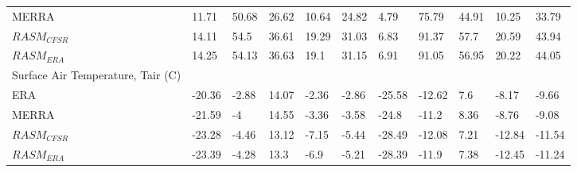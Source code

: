 \begin{table}
{\begin{tabular}{lllllllllll}
MERRA                                          & 11.71                        & 50.68  & 26.62  & 10.64  & 24.82  & 4.79   & 75.79  & 44.91  & 10.25  & 33.79  \\
$RASM_{CFSR}$                                       & 14.11                        & 54.5   & 36.61  & 19.29  & 31.03  & 6.83   & 91.37  & 57.7   & 20.59  & 43.94  \\
$RASM_{ERA}$                                        & 14.25                        & 54.13  & 36.63  & 19.1   & 31.15  & 6.91   & 91.05  & 56.95  & 20.22  & 44.05  \\
Surface Air Temperature, Tair (C)              &                              &        &        &        &        &        &        &        &        &        \\
ERA                                            & -20.36                       & -2.88  & 14.07  & -2.36  & -2.86  & -25.58 & -12.62 & 7.6    & -8.17  & -9.66  \\
MERRA                                          & -21.59                       & -4     & 14.55  & -3.36  & -3.58  & -24.8  & -11.2  & 8.36   & -8.76  & -9.08  \\
$RASM_{CFSR}$                                       & -23.28                       & -4.46  & 13.12  & -7.15  & -5.44  & -28.49 & -12.08 & 7.21   & -12.84 & -11.54 \\
$RASM_{ERA}$                                        & -23.39                       & -4.28  & 13.3   & -6.9   & -5.21  & -28.39 & -11.9  & 7.38   & -12.45 & -11.24
\end{tabular}
}
\end{table}
